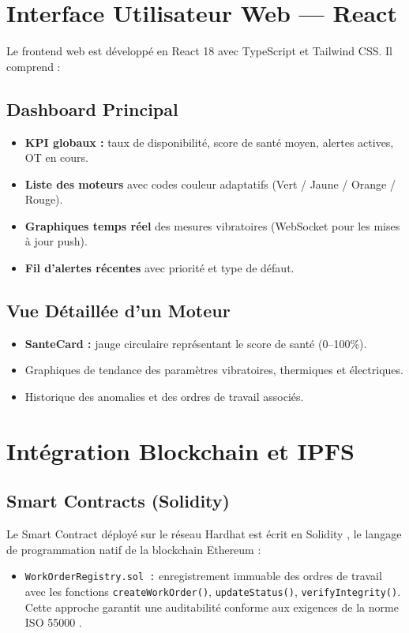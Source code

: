 \documentclass[12pt, a4paper, oneside]{report}
\begin{document}
\section{Interface Utilisateur Web — React}

Le frontend web est développé en React 18 avec TypeScript et Tailwind CSS. Il comprend :

\subsection{Dashboard Principal}
\begin{itemize}
  \item \textbf{KPI globaux :} taux de disponibilité, score de santé moyen, alertes actives, OT en cours.
  \item \textbf{Liste des moteurs} avec codes couleur adaptatifs (Vert / Jaune / Orange / Rouge).
  \item \textbf{Graphiques temps réel} des mesures vibratoires (WebSocket pour les mises à jour push).
  \item \textbf{Fil d'alertes récentes} avec priorité et type de défaut.
\end{itemize}

\subsection{Vue Détaillée d'un Moteur}
\begin{itemize}
  \item \textbf{SanteCard :} jauge circulaire représentant le score de santé (0--100\%).
  \item Graphiques de tendance des paramètres vibratoires, thermiques et électriques.
  \item Historique des anomalies et des ordres de travail associés.
\end{itemize}

\section{Intégration Blockchain et IPFS}

\subsection{Smart Contracts (Solidity)}

Le Smart Contract déployé sur le réseau Hardhat \cite{hardhat} est écrit en Solidity \cite{ethereum},
le langage de programmation natif de la blockchain Ethereum \cite{buterin2014} :
\begin{itemize}
  \item \texttt{WorkOrderRegistry.sol :} enregistrement immuable des ordres de travail
  avec les fonctions \texttt{createWorkOrder()}, \texttt{updateStatus()}, \texttt{verifyIntegrity()}.
  Cette approche garantit une auditabilité conforme aux exigences de la norme ISO 55000 \cite{iso55000}.
\end{itemize}
\end{document}
